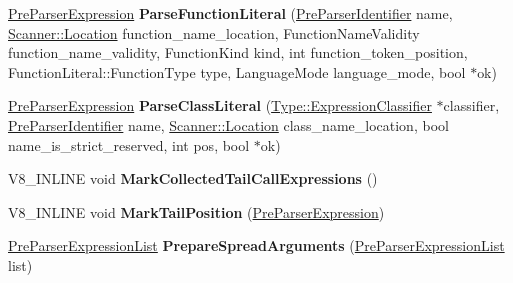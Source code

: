 \begin{DoxyCompactItemize}
\item 
\hyperlink{classv8_1_1internal_1_1_pre_parser_expression}{Pre\+Parser\+Expression} {\bfseries Parse\+Function\+Literal} (\hyperlink{classv8_1_1internal_1_1_pre_parser_identifier}{Pre\+Parser\+Identifier} name, \hyperlink{structv8_1_1internal_1_1_scanner_1_1_location}{Scanner\+::\+Location} function\+\_\+name\+\_\+location, Function\+Name\+Validity function\+\_\+name\+\_\+validity, Function\+Kind kind, int function\+\_\+token\+\_\+position, Function\+Literal\+::\+Function\+Type type, Language\+Mode language\+\_\+mode, bool $\ast$ok)\hypertarget{classv8_1_1internal_1_1_pre_parser_traits_af7f249c21d0fea13620b7a67fd4c22bd}{}\label{classv8_1_1internal_1_1_pre_parser_traits_af7f249c21d0fea13620b7a67fd4c22bd}

\item 
\hyperlink{classv8_1_1internal_1_1_pre_parser_expression}{Pre\+Parser\+Expression} {\bfseries Parse\+Class\+Literal} (\hyperlink{classv8_1_1internal_1_1_expression_classifier}{Type\+::\+Expression\+Classifier} $\ast$classifier, \hyperlink{classv8_1_1internal_1_1_pre_parser_identifier}{Pre\+Parser\+Identifier} name, \hyperlink{structv8_1_1internal_1_1_scanner_1_1_location}{Scanner\+::\+Location} class\+\_\+name\+\_\+location, bool name\+\_\+is\+\_\+strict\+\_\+reserved, int pos, bool $\ast$ok)\hypertarget{classv8_1_1internal_1_1_pre_parser_traits_aaf0beb97558a56b0c9049402a4100686}{}\label{classv8_1_1internal_1_1_pre_parser_traits_aaf0beb97558a56b0c9049402a4100686}

\item 
V8\+\_\+\+I\+N\+L\+I\+NE void {\bfseries Mark\+Collected\+Tail\+Call\+Expressions} ()\hypertarget{classv8_1_1internal_1_1_pre_parser_traits_a82387c75fd369ed9522a814a7c168be9}{}\label{classv8_1_1internal_1_1_pre_parser_traits_a82387c75fd369ed9522a814a7c168be9}

\item 
V8\+\_\+\+I\+N\+L\+I\+NE void {\bfseries Mark\+Tail\+Position} (\hyperlink{classv8_1_1internal_1_1_pre_parser_expression}{Pre\+Parser\+Expression})\hypertarget{classv8_1_1internal_1_1_pre_parser_traits_ad8abaa36bb58f5fd27c45abad854a453}{}\label{classv8_1_1internal_1_1_pre_parser_traits_ad8abaa36bb58f5fd27c45abad854a453}

\item 
\hyperlink{classv8_1_1internal_1_1_pre_parser_list}{Pre\+Parser\+Expression\+List} {\bfseries Prepare\+Spread\+Arguments} (\hyperlink{classv8_1_1internal_1_1_pre_parser_list}{Pre\+Parser\+Expression\+List} list)\hypertarget{classv8_1_1internal_1_1_pre_parser_traits_a9942e65825d31a72cb8a5184843f89b8}{}\label{classv8_1_1internal_1_1_pre_parser_traits_a9942e65825d31a72cb8a5184843f89b8}


\end{DoxyCompactItemize}
